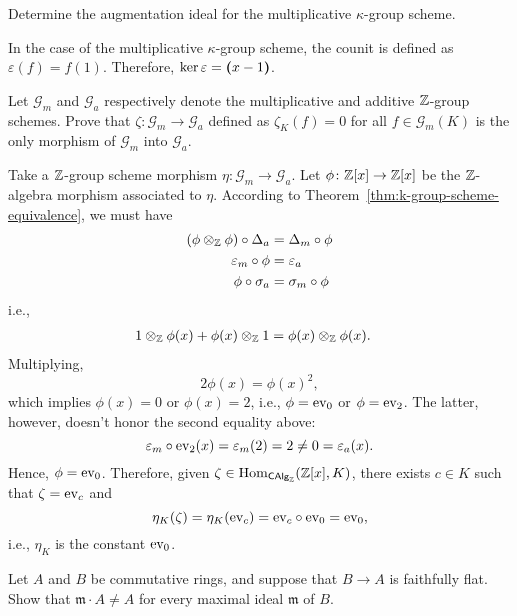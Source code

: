 \begin{exr}
    Determine the augmentation ideal for the multiplicative $\kappa$-group scheme.
\end{exr}

\begin{solution}
    In the case of the multiplicative $\kappa$-group scheme, the counit is defined as $\varepsilon(f)=f(1)$. Therefore, $\ker\varepsilon = \textrm{\boldmath$($}x-1\textrm{\boldmath$)$}$.
\end{solution}

\begin{exr}
    Let\/ $\mathcal{G}_m$ and\/ $\mathcal{G}_a$ respectively denote the multiplicative and additive\/ $\mathbb{Z}$-group schemes. Prove that\/ $\zeta\colon\mathcal{G}_m\to\mathcal{G}_a$ defined as\/ $\zeta_K(f)=0$ for all\/ $f\in\mathcal{G}_m(K)$ is the only morphism of\/ $\mathcal{G}_m$ into\/ $\mathcal{G}_a$.
\end{exr}

\begin{solution}
    Take a $\mathbb{Z}$-group scheme morphism $\eta\colon\mathcal G_m\to\mathcal G_a$. Let $\phi\colon\mathbb{Z}[x]\to\mathbb{Z}[x]$ be the $\mathbb{Z}$-algebra morphism associated to $\eta$. According to Theorem~\ref{thm:k-group-scheme-equivalence}, we must have
    \begin{align*}
        (\phi\otimes_{\mathbb{Z}}\phi)\circ\Delta_a &= \Delta_m\circ\phi\\
        \varepsilon_m\circ\phi &= \varepsilon_a\\
        \phi\circ\sigma_a &= \sigma_m\circ\phi
    \end{align*}
    i.e.,
    \begin{align*}
        1\otimes_{\mathbb{Z}}\phi(x)+\phi(x)\otimes_{\mathbb{Z}}1
            &=\phi(x)\otimes_{\mathbb{Z}}\phi(x).
    \end{align*}
    Multiplying,
    $$
        2\phi(x)=\phi(x)^2,
    $$
    which implies $\phi(x)=0$ or $\phi(x)=2$, i.e., $\phi=\text{\rm ev}_0$ or $\phi=\text{\rm ev}_2$. The latter, however, doesn't honor the second equality above:
    $$
        \varepsilon_m\circ\text{\rm ev}_2(x) = \varepsilon_m(2) = 2
            \ne 0=\varepsilon_a(x).
    $$
    Hence, $\phi=\text{\rm ev}_0$. Therefore, given $\zeta\in{\rm Hom}_{\mathsf{CAlg}_{\mathbb{Z}}}(\mathbb{Z}[x],K)$, there exists $c\in K$ such that $\zeta=\text{\rm ev}_c$ and
    $$
        \eta_K(\zeta) = \eta_K(\text{\rm ev}_c) = \text{\rm ev}_c\circ\text{\rm ev}_0 = \text{\rm ev}_0,
    $$
    i.e., $\eta_K$ is the constant $\text{\rm ev}_0$.
\end{solution}

\begin{exr}
    Let\/ $A$ and\/ $B$ be commutative rings, and suppose that\/ $B\to A$ is faithfully flat. Show that\/ $\mathfrak m\cdot A\ne A$ for every maximal ideal\/ $\mathfrak m$ of\/ $B$.
\end{exr}

